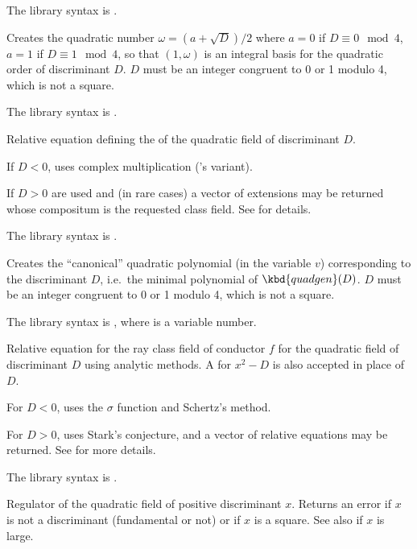 The library syntax is .

\label{se:quadgen}
Creates the quadratic
number $\omega=(a+\sqrt{D})/2$ where $a=0$ if $D\equiv0\mod4$,
$a=1$ if $D\equiv1\mod4$, so that $(1,\omega)$ is an integral basis for the
quadratic order of discriminant $D$. $D$ must be an integer congruent to 0 or
1 modulo 4, which is not a square.

The library syntax is .

\label{se:quadhilbert}
Relative equation defining the
 of the quadratic field of discriminant $D$.

If $D < 0$, uses complex multiplication ('s variant).

If $D > 0$  are used and (in rare cases) a
vector of extensions may be returned whose compositum is the requested class
field. See  for details.

The library syntax is .

\label{se:quadpoly}
Creates the ``canonical'' quadratic
polynomial (in the variable $v$) corresponding to the discriminant $D$,
i.e.~the minimal polynomial of $\kbd{quadgen}(D)$. $D$ must be an integer
congruent to 0 or 1 modulo 4, which is not a square.

The library syntax is , where  is a variable number.

\label{se:quadray}
Relative equation for the ray
class field of conductor $f$ for the quadratic field of discriminant $D$
using analytic methods. A  for $x^2 - D$ is also accepted in place
of $D$.

For $D < 0$, uses the $\sigma$ function and Schertz's method.

For $D>0$, uses Stark's conjecture, and a vector of relative equations may be
returned. See  for more details.

The library syntax is .

\label{se:quadregulator}
Regulator of the quadratic field of positive discriminant $x$. Returns
an error if $x$ is not a discriminant (fundamental or not) or if $x$ is a
square. See also  if $x$ is large.


